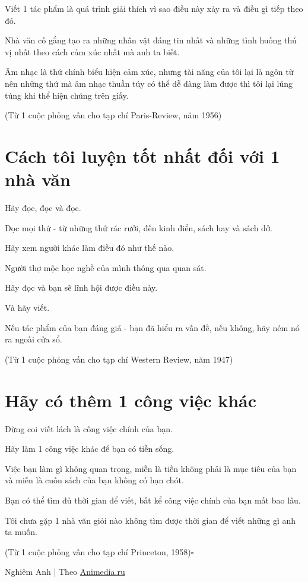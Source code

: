 \documentclass{book}
\numberwithin{equation}{section}
\begin{document}
Viết 1 tác phẩm là quá trình giải thích vì sao điều này xảy ra và điều gì tiếp theo đó.

Nhà văn cố gắng tạo ra những nhân vật đáng tin nhất và những tình huống thú vị nhất theo cách cảm xúc nhất mà anh ta biết.

Âm nhạc là thứ chính biểu hiện cảm xúc, nhưng tài năng của tôi lại là ngôn từ nên những thứ mà âm nhạc thuần túy có thể dễ dàng làm được thì tôi lại lúng túng khi thể hiện chúng trên giấy.

(Từ 1 cuộc phỏng vấn cho tạp chí Paris-Review, năm 1956)

\section{Cách tôi luyện tốt nhất đối với 1 nhà văn}
Hãy đọc, đọc và đọc.

Đọc mọi thứ - từ những thứ rác rưởi, đến kinh điển, sách hay và sách dở.

Hãy xem người khác làm điều đó như thế nào.

Người thợ mộc học nghề của mình thông qua quan sát.

Hãy đọc và bạn sẽ lĩnh hội được điều này.

Và hãy viết.

Nếu tác phẩm của bạn đáng giá - bạn đã hiểu ra vấn đề, nếu không, hãy ném nó ra ngoài cửa sổ.

(Từ 1 cuộc phỏng vấn cho tạp chí Western Review, năm 1947)


\section{Hãy có thêm 1 công việc khác}
Đừng coi viết lách là công việc chính của bạn.

Hãy làm 1 công việc khác để bạn có tiền sống.

Việc bạn làm gì không quan trọng, miễn là tiền không phải là mục tiêu của bạn và miễn là cuốn sách của bạn không có hạn chót.

Bạn có thể tìm đủ thời gian để viết, bất kể công việc chính của bạn mất bao lâu.

Tôi chưa gặp 1 nhà văn giỏi nào không tìm được thời gian để viết những gì anh ta muốn.

(Từ 1 cuộc phỏng vấn cho tạp chí Princeton, 1958)\hfill$\square$

\begin{flushright}
    Nghiêm Anh | Theo \url{Animedia.ru}
\end{flushright}
\end{document}
